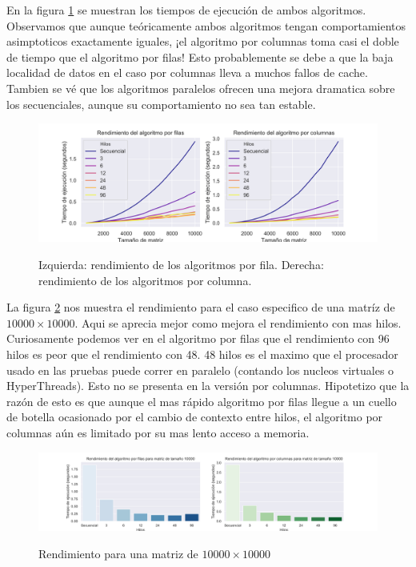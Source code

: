 \documentclass{report}
\begin{document}
En la figura \ref{fig:starperf} se muestran los tiempos de ejecución de ambos
algoritmos. Observamos que aunque teóricamente ambos algoritmos tengan
comportamientos asimptoticos exactamente iguales, ¡el algoritmo por columnas toma
casi el doble de tiempo que el algoritmo por filas! Esto probablemente se debe a
que la baja localidad de datos en el caso por columnas lleva a muchos fallos de
cache. Tambien se vé que los algoritmos paralelos ofrecen una mejora dramatica
sobre los secuenciales, aunque su comportamiento no sea tan estable.

\begin{figure}[h]
    \centering
  \caption{Izquierda: rendimiento de los algoritmos por fila. Derecha: rendimiento
           de los algoritmos por columna.}
\includegraphics[width=\textwidth]{stars_perf}
\label{fig:starperf}
\end{figure}

La figura \ref{fig:starperfbar} nos muestra el rendimiento para el caso especifico
de una matríz de $10000 \times 10000$. Aqui se aprecia mejor como mejora el rendimiento con
mas hilos. Curiosamente podemos ver en el algoritmo por filas que el rendimiento
con 96 hilos es peor que el rendimiento con 48. 48 hilos es el maximo que el
procesador usado en las pruebas puede correr en paralelo (contando los nucleos
virtuales o HyperThreads). Esto no se presenta en la versión por columnas.
Hipotetizo que la razón de esto es que aunque el mas rápido algoritmo por filas
llegue a un cuello de botella ocasionado por el cambio de contexto entre hilos,
el algoritmo por columnas aún es limitado por su mas lento acceso a memoria.

\begin{figure}[H]
    \centering
  \caption{Rendimiento para una matriz de $10000 \times 10000$}
  \includegraphics[width=\textwidth]{stars_perf_bar}
\label{fig:starperfbar}
\end{figure}
\end{document}

